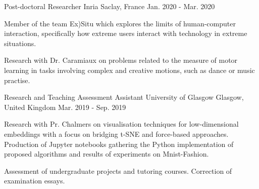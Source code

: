 

\begin{cventries}

  \cventry
    {Post-doctoral Researcher} %
    {Inria} %
    {Saclay, France} %
    {Jan. 2020 - Mar. 2020} %
    {
      \begin{cvitems} %
        \item {Member of the team Ex)Situ which explores the limits of human-computer interaction, specifically how extreme users interact with technology in extreme situations.}
        \item {Research with Dr. Caramiaux on problems related to the measure of motor learning in tasks involving complex and creative motions, such as dance or music practise.}
      \end{cvitems}
    }

  \cventry
    {Research and Teaching Assessment Assistant} %
    {University of Glasgow} %
    {Glasgow, United Kingdom} %
    {Mar. 2019 - Sep. 2019} %
    {
      \begin{cvitems} %
        \item {Research with Pr. Chalmers on visualisation techniques for low-dimensional embeddings with a focus on bridging t-SNE and force-based approaches. Production of Jupyter notebooks gathering the Python implementation of proposed algorithms and results of experiments on Mnist-Fashion.}
        \item {Assessment of undergraduate projects and tutoring courses. Correction of examination essays.}
      \end{cvitems}
    }


\end{cventries}
